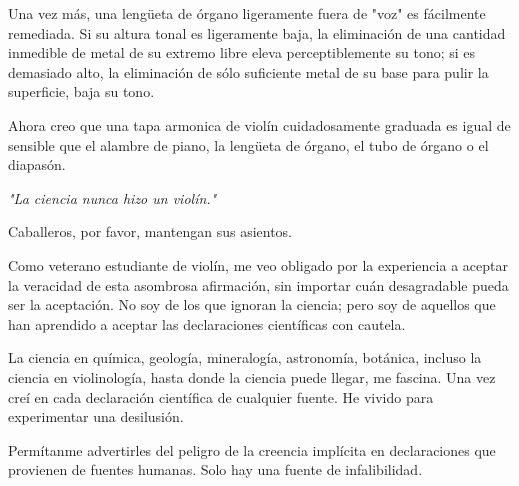 \documentclass[12pt]{book}
\begin{document}
Una vez más, una lengüeta de órgano ligeramente fuera de "voz" es fácilmente remediada. Si su altura tonal es ligeramente baja, la eliminación de una cantidad inmedible de metal de su extremo libre eleva perceptiblemente su tono; si es demasiado alto, la eliminación de sólo suficiente metal de su base para pulir la superficie, baja su tono.

Ahora creo que una tapa armonica de violín cuidadosamente graduada es igual de sensible que el alambre de piano, la lengüeta de órgano, el tubo de órgano o el diapasón.

\textit{"La ciencia nunca hizo un violín."}

Caballeros, por favor, mantengan sus asientos.

Como veterano estudiante de violín, me veo obligado por la experiencia a aceptar la veracidad de esta asombrosa afirmación, sin importar cuán desagradable pueda ser la aceptación. No soy de los que ignoran la ciencia; pero soy de aquellos que han aprendido a aceptar las declaraciones científicas con cautela.

La ciencia en química, geología, mineralogía, astronomía, botánica, incluso la ciencia en violinología, hasta donde la ciencia puede llegar, me fascina. Una vez creí en cada declaración científica de cualquier fuente. He vivido para experimentar una desilusión.

Permítanme advertirles del peligro de la creencia implícita en declaraciones que provienen de fuentes humanas. Solo hay una fuente de infalibilidad.
\end{document}
